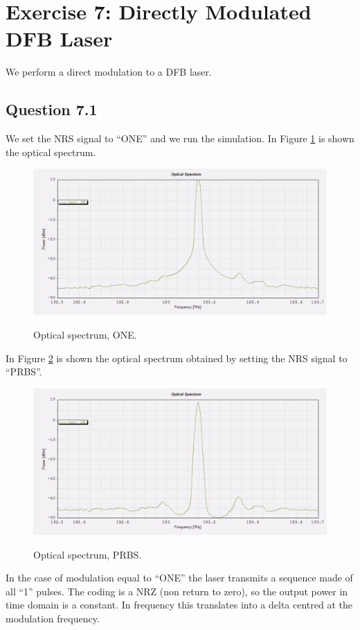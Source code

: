 \documentclass[a4paper,10pt]{report}
\begin{document}
\newpage
\section*{Exercise 7: Directly Modulated DFB Laser}
We perform a direct modulation to a DFB laser.

\subsection*{Question 7.1}
We set the NRS signal to ``ONE'' and we run the simulation. In Figure \ref{7_1one} is shown the optical spectrum.

\begin{figure}[!ht]
  \centering
  \includegraphics[width=12cm]{7_1one.png}\\
  \caption{Optical spectrum, ONE.}
  \label{7_1one}
\end{figure}

In Figure \ref{7_1} is shown the optical spectrum obtained by setting the NRS signal to ``PRBS''.

\begin{figure}[!ht]
  \centering
  \includegraphics[width=12cm]{7_1.png}\\
  \caption{Optical spectrum, PRBS.}
  \label{7_1}
\end{figure}

In the case of modulation equal to ``ONE'' the laser transmits a sequence made of all ``1'' pulses. The coding is a NRZ (non return to zero), so the
output power in time domain is a constant. In frequency this translates into a delta centred at the modulation frequency.
\end{document}
